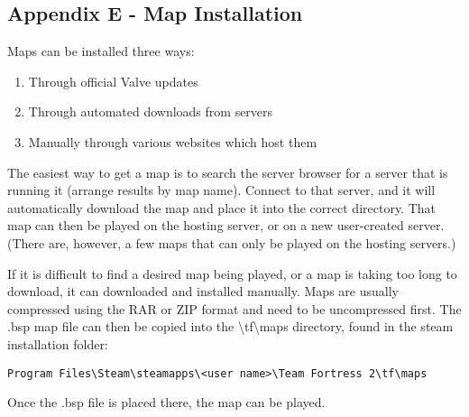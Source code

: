 \subsection{Appendix E - Map Installation}
Maps can be installed three ways:
\begin{enumerate}
  \setlength{\itemsep}{1pt}
  \setlength{\parskip}{0pt}
  \setlength{\parsep}{0pt}
  \item Through official Valve updates
  \item Through automated downloads from servers
  \item Manually through various websites which host them
\end{enumerate}


The easiest way to get a map is to search the server browser for a server that is running it (arrange results by map name). Connect to that server, and it will automatically download the map and place it into the correct directory. That map can then be played on the hosting server, or on a new user-created server.  (There are, however, a few maps that can only be played on the hosting servers.)

If it is difficult to find a desired map being played, or a map is taking too long to download, it can downloaded and installed manually. Maps are usually compressed using the RAR or ZIP format and need to be uncompressed first.  The .bsp map file can then be copied into the \textbackslash tf\textbackslash maps directory, found in the steam installation folder:
\begin{lstlisting}
Program Files\Steam\steamapps\<user name>\Team Fortress 2\tf\maps
\end{lstlisting}
Once the .bsp file is placed there, the map can be played.